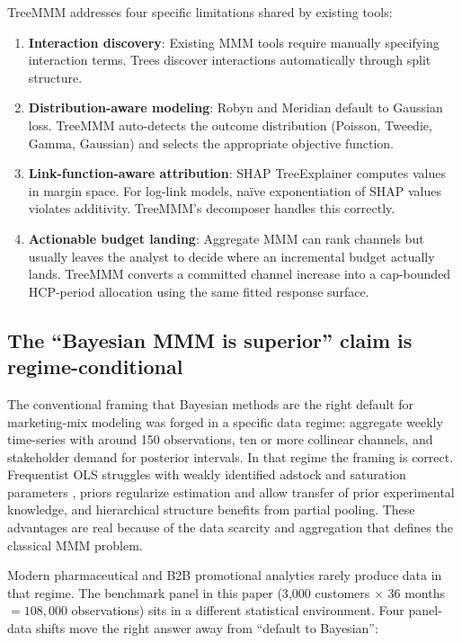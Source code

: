 \documentclass[review,12pt]{elsarticle}
\begin{document}
TreeMMM addresses four specific limitations shared by existing tools:

\begin{enumerate}
\item \textbf{Interaction discovery}: Existing MMM tools require manually
  specifying interaction terms. Trees discover interactions automatically
  through split structure.
\item \textbf{Distribution-aware modeling}: Robyn and Meridian default to
  Gaussian loss. TreeMMM auto-detects the outcome distribution (Poisson,
  Tweedie, Gamma, Gaussian) and selects the appropriate objective function.
\item \textbf{Link-function-aware attribution}: SHAP TreeExplainer
  \cite{lundberg2017unified} computes
  values in margin space. For log-link models, na\"{i}ve exponentiation of
  SHAP values violates additivity. TreeMMM's decomposer handles this correctly.
\item \textbf{Actionable budget landing}: Aggregate MMM can rank channels but
  usually leaves the analyst to decide where an incremental budget actually
  lands. TreeMMM converts a committed channel increase into a cap-bounded
  HCP-period allocation using the same fitted response surface.
\end{enumerate}

\subsection{The ``Bayesian MMM is superior'' claim is regime-conditional}
\label{sec:intro:regime}

The conventional framing that Bayesian methods are the right default for
marketing-mix modeling was forged in a specific data regime: aggregate weekly
time-series with around 150 observations, ten or more collinear channels, and
stakeholder demand for posterior intervals. In that regime the framing is
correct. Frequentist OLS struggles with weakly identified adstock and
saturation parameters \cite{jin2017bayesian,chan2017challenges}, priors
regularize estimation and allow transfer of prior
experimental knowledge, and hierarchical structure benefits from partial
pooling. These advantages are real because of the data scarcity and aggregation
that defines the classical MMM problem.

Modern pharmaceutical and B2B promotional analytics rarely produce data in that
regime. The benchmark panel in this paper (3{,}000 customers $\times$ 36 months
$= 108{,}000$ observations) sits in a different statistical environment. Four
panel-data shifts move the right answer away from ``default to Bayesian'':
\end{document}
